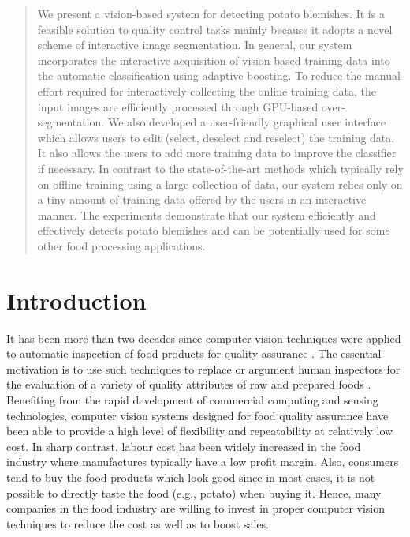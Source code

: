 \documentclass[twocolumn]{svjour3}          %
\begin{document}
\begin{abstract}
We present a vision-based system for detecting potato blemishes. It is a feasible solution to quality control tasks mainly because it adopts a novel scheme of interactive image segmentation. In general, our system incorporates the interactive acquisition of vision-based training data into the automatic classification using adaptive boosting. To reduce the manual effort required for interactively collecting the online training data, the input images are efficiently processed through GPU-based over-segmentation. We also developed a user-friendly graphical user interface which allows users to edit (select, deselect and reselect) the training data. It also allows the users to add more training data to improve the classifier if necessary. In contrast to the state-of-the-art methods which typically rely on offline training using a large collection of data, our system relies only on a tiny amount of training data offered by the users in an interactive manner. The experiments demonstrate that our system efficiently and effectively detects potato blemishes and can be potentially used for some other food processing applications.  
\end{abstract}

\section{Introduction}
\label{sec:intro}
It has been more than two decades since computer vision techniques were applied to automatic inspection of food products for quality assurance \cite{DE90}. The essential motivation is to use such techniques to replace or argument human inspectors for the evaluation of a variety of quality attributes of raw and prepared foods \cite{SG96}. Benefiting from the rapid development of commercial computing and sensing technologies, computer vision systems designed for food quality assurance have been able to provide a high level of flexibility and repeatability at relatively low cost. In sharp contrast, labour cost has been widely increased in the food industry where manufactures typically have a low profit margin. Also, consumers tend to buy the food products which look good since in most cases, it is not possible to directly taste the food (e.g., potato) when buying it. Hence, many companies in the food industry are willing to invest in proper computer vision techniques to reduce the cost as well as to boost sales. 
\end{document}
